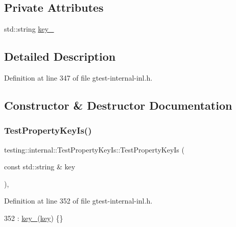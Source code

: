 \subsection*{Private Attributes}
\begin{DoxyCompactItemize}
\item 
std\+::string \hyperlink{classtesting_1_1internal_1_1TestPropertyKeyIs_a857f42b8753df8efccc8f38196b150b9}{key\+\_\+}
\end{DoxyCompactItemize}


\subsection{Detailed Description}


Definition at line 347 of file gtest-\/internal-\/inl.\+h.



\subsection{Constructor \& Destructor Documentation}
\mbox{\label{classtesting_1_1internal_1_1TestPropertyKeyIs_a509ed1271caa1032e40c5d811b3da385}} 
\subsubsection{\texorpdfstring{Test\+Property\+Key\+Is()}{TestPropertyKeyIs()}}
{\footnotesize\ttfamily testing\+::internal\+::\+Test\+Property\+Key\+Is\+::\+Test\+Property\+Key\+Is (\begin{DoxyParamCaption}\item[{const std\+::string \&}]{key }\end{DoxyParamCaption})\hspace{0.3cm}{\ttfamily [inline]}, {\ttfamily [explicit]}}



Definition at line 352 of file gtest-\/internal-\/inl.\+h.


\begin{DoxyCode}
352 : \hyperlink{classtesting_1_1internal_1_1TestPropertyKeyIs_a857f42b8753df8efccc8f38196b150b9}{key\_}(\hyperlink{namespacekeyboard__server__node_af0ebd8a9e1564ddc13a227c727602466}{key}) \{\}
\end{DoxyCode}


